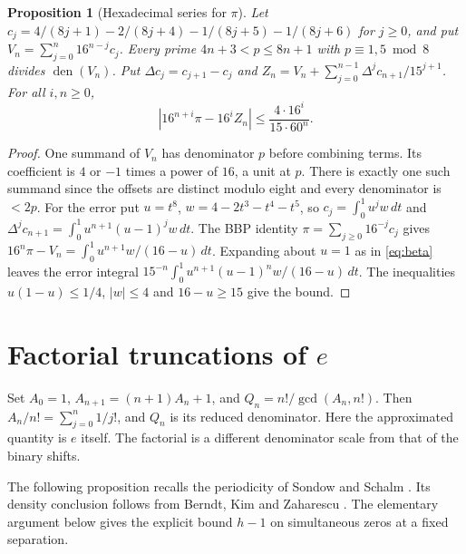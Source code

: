 \documentclass[11pt]{article}
\newtheorem{proposition}[theorem]{Proposition}
\DeclareMathOperator{\den}{den}
\begin{document}
\begin{proposition}[Hexadecimal series for $\pi$]\label{prop:bbp}
Let $c_j=4/(8j+1)-2/(8j+4)-1/(8j+5)-1/(8j+6)$ for $j\ge0$, and put
$V_n=\sum_{j=0}^n16^{n-j}c_j$. Every prime $4n+3<p\le8n+1$ with
$p\equiv1,5\bmod8$ divides $\den(V_n)$. Put $\Delta c_j=c_{j+1}-c_j$ and
$Z_n=V_n+\sum_{j=0}^{n-1}\Delta^j c_{n+1}/15^{j+1}$. For all $i,n\ge0$,
\[
 |16^{n+i}\pi-16^i Z_n|\le\frac{4\cdot16^i}{15\cdot60^n}.
\]
\end{proposition}
\begin{proof}
One summand of $V_n$ has denominator $p$ before combining terms. Its
coefficient is $4$ or $-1$ times a power of $16$, a unit at $p$.
There is exactly one such summand since the offsets are distinct modulo eight
and every denominator is $<2p$.
For the error put $u=t^8$, $w=4-2t^3-t^4-t^5$, so
$c_j=\int_0^1u^jw\,dt$ and $\Delta^j c_{n+1}=\int_0^1u^{n+1}(u-1)^jw\,dt$.
The BBP identity $\pi=\sum_{j\ge0}16^{-j}c_j$ \cite{bbp}
gives $16^n\pi-V_n=\int_0^1u^{n+1}w/(16-u)\,dt$.
Expanding about $u=1$ as in \eqref{eq:beta} leaves the error integral
$15^{-n}\int_0^1u^{n+1}(u-1)^nw/(16-u)\,dt$. The inequalities
$u(1-u)\le1/4$, $|w|\le4$ and $16-u\ge15$ give the bound.
\end{proof}

\section{Factorial truncations of \texorpdfstring{$e$}{e}}\label{sec:e}
Set $A_0=1$, $A_{n+1}=(n+1)A_n+1$, and $Q_n=n!/\gcd(A_n,n!)$.
Then $A_n/n!=\sum_{j=0}^n1/j!$, and $Q_n$ is its reduced denominator.
Here the approximated quantity is $e$ itself. The factorial is a different
denominator scale from that of the binary shifts.

The following proposition recalls the periodicity of Sondow and Schalm \cite[Prop.~A.5]{sondow}. Its density conclusion follows from Berndt, Kim and Zaharescu \cite[Thm.~1.6 and \S4]{bkzgeneral}. The elementary argument below gives the explicit bound $h-1$ on simultaneous zeros at a fixed separation.
\end{document}

